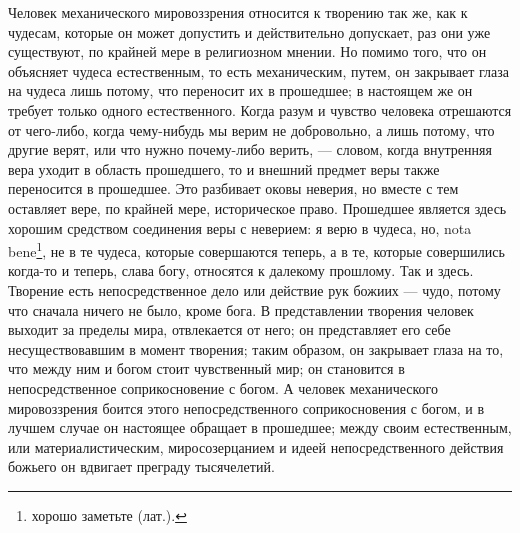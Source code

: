 \documentclass[12pt,oneside]{book}
\begin{document}
Человек механического мировоззрения относится к творению так же, как к чудесам, которые он может допустить и действительно допускает, раз они уже существуют, по крайней мере в религиозном мнении. Но помимо того, что он объясняет чудеса естественным, то есть механическим, путем, он закрывает глаза на чудеса лишь потому, что переносит их в прошедшее; в настоящем же он требует только одного естественного. Когда разум и чувство человека отрешаются от чего-либо, когда чему-нибудь мы верим не добровольно, а лишь потому, что другие верят, или что нужно почему-либо верить, --- словом, когда внутренняя вера уходит в область прошедшего, то и внешний предмет веры также переносится в прошедшее. Это разбивает оковы неверия, но вместе с тем оставляет вере, по крайней мере, историческое право. Прошедшее является здесь хорошим средством соединения веры с неверием: я верю в чудеса, но, nota bene\footnote{хорошо заметьте (лат.).}, не в те чудеса, которые совершаются теперь, а в те, которые совершились когда-то и теперь, слава богу, относятся к далекому прошлому. Так и здесь. Творение есть непосредственное дело или действие рук божиих --- чудо, потому что сначала ничего не было, кроме бога. В представлении творения человек выходит за пределы мира, отвлекается от него; он представляет его себе несуществовавшим в момент творения; таким образом, он закрывает глаза на то, что между ним и богом стоит чувственный мир; он становится в непосредственное соприкосновение с богом. А человек механического мировоззрения боится этого непосредственного соприкосновения с богом, и в лучшем случае он настоящее обращает в прошедшее; между своим естественным, или материалистическим, миросозерцанием и идеей непосредственного действия божьего он вдвигает преграду тысячелетий.
\end{document}
